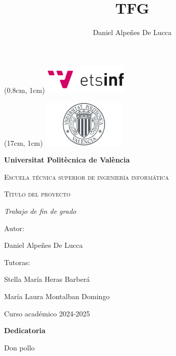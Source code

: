 \documentclass{article}
\title{TFG}
\author{Daniel Alpeñes De Lucca}
\begin{document}
\begin{textblock*}{5cm}(0.8cm, 1cm) %
    \includegraphics[width=4cm]{etsinf_logo} %
\end{textblock*}
\begin{textblock*}{5cm}(17cm, 1cm) %
    \includegraphics[width=4cm]{UPV_logo} %
\end{textblock*}

\begin{titlepage}
\vspace*{2cm} %
\centering
{\bfseries\LARGE Universitat Politècnica de València \par}
\vspace{1cm}
{\scshape\Large Escuela técnica superior de ingeniería informática \par}
\vspace{3cm}
{\scshape\Huge T\'itulo del proyecto \par}
\vspace{3cm}
{\itshape\Large Trabajo de fin de grado \par}
\vfill
\vspace{3cm}
{\Large Autor:\par}
{\Large  Daniel Alpeñes De Lucca \par}
\vspace{1cm}
{\Large Tutoras:\par}
{\Large  Stella María Heras Barberá \par}
{\Large  María Laura Montalban Domingo \par}

\vfill
{\Large Curso académico 2024-2025 \par}
\end{titlepage}

\begin{titlepage}
{\bfseries\LARGE Dedicatoria \par}
Don pollo
\end{titlepage}
\end{document}
